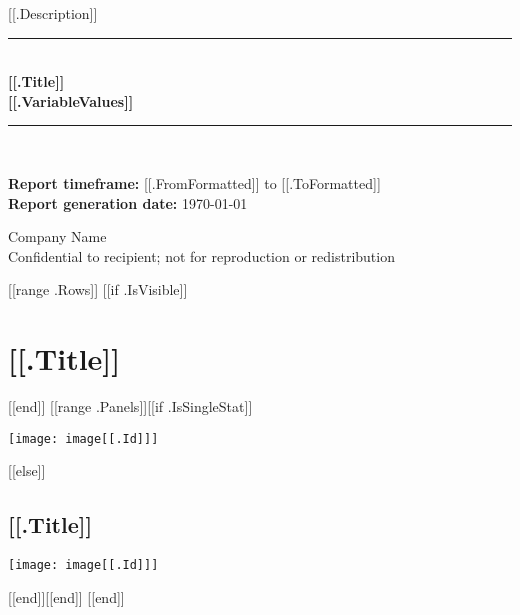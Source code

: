 \documentclass{article}
\begin{document}
\begin{titlepage}
\begin{flushright}
\end{flushright}

\center
\newcommand{\HRule}{\rule{\linewidth}{0.5mm}}

\textsf{\large [[.Description]]}\\[0.5cm]
\HRule \\[0.4cm]
{ \huge \bfseries [[.Title]]}\\[0.4cm]
{ \huge \bfseries [[.VariableValues]]}\\[0.4cm]
\HRule \\[1.5cm]

\begin{flushleft}
\large {\textbf{Report timeframe:} [[.FromFormatted]] to [[.ToFormatted]]}\\
\large {\textbf{Report generation date:} \today}\\[2cm]
\end{flushleft}

\vfill

\textsf{\LARGE Company Name}\\
\textsf{\large Confidential to recipient; not for reproduction or redistribution}\\

\end{titlepage}

\tableofcontents

\begin{center}

[[range .Rows]]
[[if .IsVisible]]
\newpage
\section{[[.Title]]}
[[end]]
[[range .Panels]][[if .IsSingleStat]]\begin{minipage}{0.3\textwidth}
\texttt{[image: image[[.Id]]]}
\end{minipage}
[[else]]\par
\subsection{[[.Title]]}
\vspace{0.5cm}
\texttt{[image: image[[.Id]]]}
\par
\vspace{0.5cm}[[end]][[end]]
[[end]]

\end{center}
\end{document}
